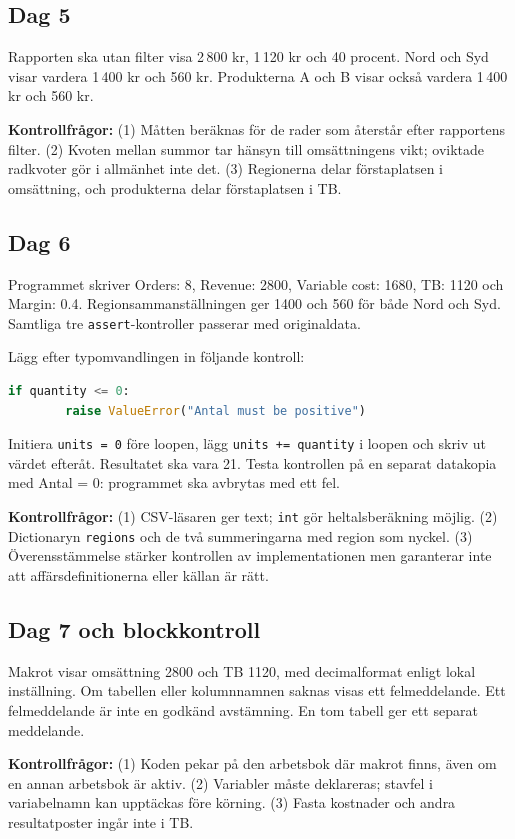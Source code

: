 \documentclass[11pt,a4paper]{article}
\begin{document}
\subsection{Dag 5}
Rapporten ska utan filter visa 2\,800 kr, 1\,120 kr och 40 procent. Nord och Syd visar vardera 1\,400 kr och 560 kr. Produkterna A och B visar också vardera 1\,400 kr och 560 kr.

\textbf{Kontrollfrågor:} (1) Måtten beräknas för de rader som återstår efter rapportens filter. (2) Kvoten mellan summor tar hänsyn till omsättningens vikt; oviktade radkvoter gör i allmänhet inte det. (3) Regionerna delar förstaplatsen i omsättning, och produkterna delar förstaplatsen i TB.

\subsection{Dag 6}
Programmet skriver Orders: 8, Revenue: 2800, Variable cost: 1680, TB: 1120 och Margin: 0.4. Regionsammanställningen ger 1400 och 560 för både Nord och Syd. Samtliga tre \texttt{assert}-kontroller passerar med originaldata.

Lägg efter typomvandlingen in följande kontroll:
\begin{lstlisting}[language=Python]
    if quantity <= 0:
        raise ValueError("Antal must be positive")
\end{lstlisting}
Initiera \texttt{units = 0} före loopen, lägg \texttt{units += quantity} i loopen och skriv ut värdet efteråt. Resultatet ska vara 21. Testa kontrollen på en separat datakopia med Antal = 0: programmet ska avbrytas med ett fel.

\textbf{Kontrollfrågor:} (1) CSV-läsaren ger text; \texttt{int} gör heltalsberäkning möjlig. (2) Dictionaryn \texttt{regions} och de två summeringarna med region som nyckel. (3) Överensstämmelse stärker kontrollen av implementationen men garanterar inte att affärsdefinitionerna eller källan är rätt.

\subsection{Dag 7 och blockkontroll}
Makrot visar omsättning 2800 och TB 1120, med decimalformat enligt lokal inställning. Om tabellen eller kolumnnamnen saknas visas ett felmeddelande. Ett felmeddelande är inte en godkänd avstämning. En tom tabell ger ett separat meddelande.

\textbf{Kontrollfrågor:} (1) Koden pekar på den arbetsbok där makrot finns, även om en annan arbetsbok är aktiv. (2) Variabler måste deklareras; stavfel i variabelnamn kan upptäckas före körning. (3) Fasta kostnader och andra resultatposter ingår inte i TB.
\end{document}
